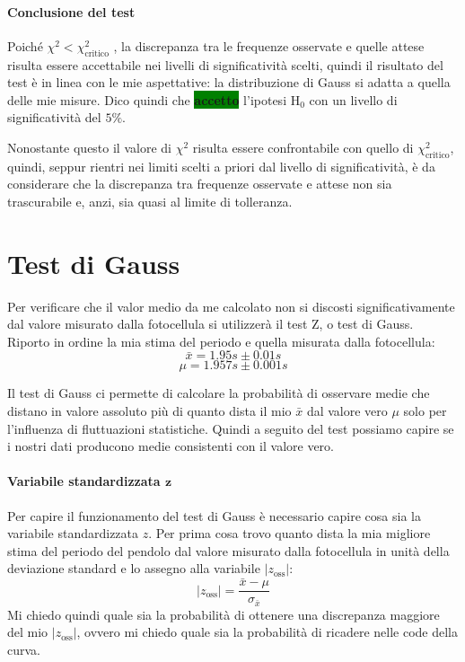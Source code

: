 \documentclass{article}
\begin{document}
	\paragraph{Conclusione del test} Poiché $\chi^2 < \chi^2_{\text{critico}}$ , la  discrepanza tra le frequenze osservate e quelle attese risulta essere accettabile nei livelli di significatività scelti, quindi il risultato del test è in linea con le mie aspettative: la distribuzione di Gauss si adatta a quella delle mie misure. Dico quindi che \colorbox{green}{\textbf{accetto}} l'ipotesi $\text{H}_{0}$ con un livello di significatività del $5\%$. 
	
	Nonostante questo il valore di $\chi^2$ risulta essere confrontabile con quello di $\chi^2_{\text{critico}}$, quindi, seppur rientri nei limiti scelti a priori dal livello di significatività, è da considerare che la discrepanza tra frequenze osservate e attese non sia trascurabile e, anzi, sia quasi al limite di tolleranza.
	
	
	\vspace{1cm}
	\section{Test di Gauss}
	Per verificare che il valor medio da me calcolato non si discosti significativamente dal valore misurato dalla fotocellula si utilizzerà il test Z, o test di Gauss. Riporto in ordine la mia stima del periodo e quella misurata dalla fotocellula:
	\[
	\bar{x} = 1.95s \pm 0.01 s
	\]
	\[
	\mu = 1.957s \pm 0.001 s
	\]

	Il test di Gauss ci permette di calcolare la probabilità di osservare medie che distano in valore assoluto più di quanto dista il mio $\bar{x}$ dal valore vero $\mu$ solo per l'influenza di fluttuazioni statistiche. Quindi a seguito del test possiamo capire se i nostri dati producono medie consistenti con il valore vero.\\
	
		\paragraph{Variabile standardizzata $\mathbf{z}$} Per capire il funzionamento del test di Gauss è necessario capire cosa sia la variabile standardizzata $z$. Per prima cosa trovo quanto dista la mia migliore stima del periodo del pendolo dal valore misurato dalla fotocellula in  unità della deviazione standard e lo assegno alla variabile $|z_{\text{oss}}|$:
	\[
	|z_{\text{oss}}| = \frac{\bar{x} - \mu}{\sigma_{\bar{x}}}
	\]
	Mi chiedo quindi quale sia la probabilità di ottenere una discrepanza maggiore del mio $|z_{\text{oss}}|$, ovvero mi chiedo quale sia la probabilità di ricadere nelle code della curva.
	
\end{document}
